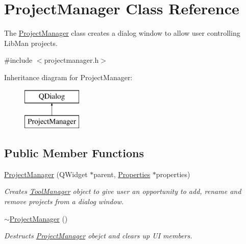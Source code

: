 \hypertarget{classProjectManager}{\section{Project\-Manager Class Reference}
\label{classProjectManager}
}


The \hyperlink{classProjectManager}{Project\-Manager} class creates a dialog window to allow user controlling Lib\-Man projects.  




{\ttfamily \#include $<$projectmanager.\-h$>$}

Inheritance diagram for Project\-Manager\-:\begin{figure}[H]
\begin{center}
\leavevmode
\includegraphics[height=2.000000cm]{classProjectManager}
\end{center}
\end{figure}
\subsection*{Public Member Functions}
\begin{DoxyCompactItemize}
\item 
\hyperlink{classProjectManager_a6a4f1ae5a6cda6ad872aaac00612f9da}{Project\-Manager} (Q\-Widget $\ast$parent, \hyperlink{classProperties}{Properties} $\ast$properties)
\begin{DoxyCompactList}\small\item\em Creates \hyperlink{classToolManager}{Tool\-Manager} object to give user an opportunity to add, rename and remove projects from a dialog window. \end{DoxyCompactList}\item 
\hyperlink{classProjectManager_ac127c8454c7c2caa948ad270930efa86}{$\sim$\-Project\-Manager} ()
\begin{DoxyCompactList}\small\item\em Destructs \hyperlink{classProjectManager}{Project\-Manager} obejct and clears up U\-I members. \end{DoxyCompactList}\end{DoxyCompactItemize}
